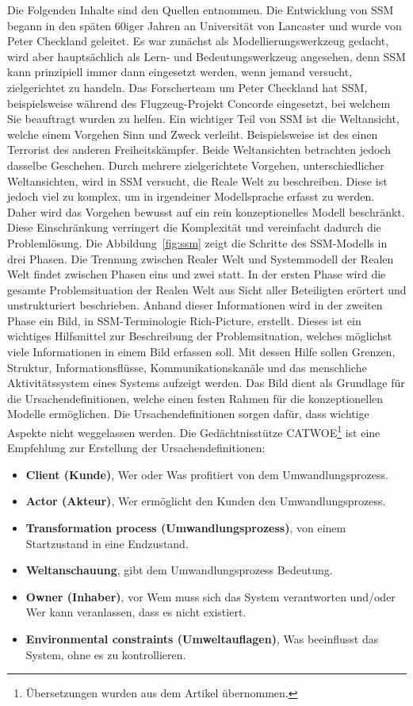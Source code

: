 \documentclass[11pt,a4paper]{report}
\begin{document}
Die Folgenden Inhalte sind den Quellen \cite{checkland, bobwill, ssmger} entnommen. Die Entwicklung von SSM begann in den späten 60iger Jahren an Universität von Lancaster und wurde von Peter Checkland geleitet. Es war zunächst als Modellierungswerkzeug gedacht, wird aber hauptsächlich als Lern- und Bedeutungswerkzeug angesehen, denn SSM kann prinzipiell immer dann eingesetzt werden, wenn jemand versucht, zielgerichtet zu handeln. Das Forscherteam um Peter Checkland hat SSM, beispielsweise während des Flugzeug-Projekt Concorde eingesetzt, bei welchem Sie beauftragt wurden zu helfen. Ein wichtiger Teil von SSM ist die Weltansicht, welche einem Vorgehen Sinn und Zweck verleiht. Beispielsweise ist des einen Terrorist des anderen Freiheitskämpfer. Beide Weltansichten betrachten jedoch dasselbe Geschehen. Durch mehrere zielgerichtete Vorgehen, unterschiedlicher Weltansichten, wird in SSM versucht, die Reale Welt zu beschreiben. Diese ist jedoch viel zu komplex, um in irgendeiner Modellsprache erfasst zu werden. Daher wird das Vorgehen bewusst auf ein rein konzeptionelles Modell beschränkt. Diese Einschränkung verringert die Komplexität und vereinfacht dadurch die Problemlösung. Die Abbildung~\ref{fig:ssm} zeigt die Schritte des SSM-Modells in drei Phasen. Die Trennung zwischen Realer Welt und Systemmodell der Realen Welt findet zwischen Phasen eins und zwei statt. In der ersten Phase wird die gesamte Problemsituation der Realen Welt aus Sicht aller Beteiligten erörtert und unstrukturiert beschrieben. Anhand dieser Informationen wird in der zweiten Phase ein Bild, in SSM-Terminologie Rich-Picture, erstellt. Dieses ist ein wichtiges Hilfsmittel zur Beschreibung der Problemsituation, welches möglichst viele Informationen in einem Bild erfassen soll. Mit dessen Hilfe sollen Grenzen, Struktur, Informationsflüsse, Kommunikationskanäle und das menschliche Aktivitätssystem eines Systems aufzeigt werden. Das Bild dient als Grundlage für die Ursachendefinitionen, welche einen festen Rahmen für die konzeptionellen Modelle ermöglichen. Die Ursachendefinitionen sorgen dafür, dass wichtige Aspekte nicht weggelassen werden. Die Gedächtnisstütze CATWOE\footnote{Übersetzungen wurden aus dem Artikel \cite{ssmger} übernommen.} ist eine Empfehlung zur Erstellung der Ursachendefinitionen:

\begin{itemize}[leftmargin=*]
\item \textbf{Client (Kunde)}, Wer oder Was profitiert von dem Umwandlungsprozess.
\item \textbf{Actor (Akteur)}, Wer ermöglicht den Kunden den Umwandlungsprozess.
\item \textbf{Transformation process (Umwandlungsprozess)}, von einem Startzustand in eine Endzustand.
\item \textbf{Weltanschauung}, gibt dem Umwandlungsprozess Bedeutung.
\item \textbf{Owner (Inhaber)}, vor Wem muss sich das System verantworten und/oder Wer kann veranlassen, dass es nicht existiert.
\item \textbf{Environmental constraints (Umweltauflagen)}, Was beeinflusst das System, ohne es zu kontrollieren.
\end{itemize}
\end{document}
